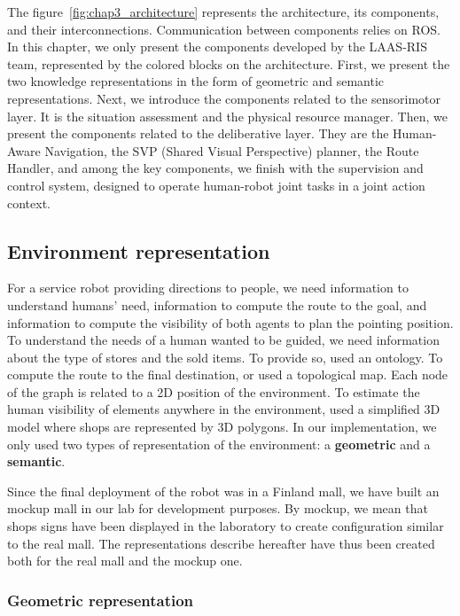 \documentclass[a4paper,11pt,twoside]{StyleThese}
\begin{document}
The figure~\ref{fig:chap3_architecture} represents the architecture, its components, and their interconnections. Communication between components relies on ROS. In this chapter, we only present the components developed by the LAAS-RIS team, represented by the colored blocks on the architecture. First, we present the two knowledge representations in the form of geometric and semantic representations. Next, we introduce the components related to the sensorimotor layer. It is the situation assessment and the physical resource manager. Then, we present the components related to the deliberative layer. They are the Human-Aware Navigation, the SVP (Shared Visual Perspective) planner, the Route Handler, and among the key components, we finish with the supervision and control system, designed to operate human-robot joint tasks in a joint action context. 

\subsection{Environment representation}\label{subsec:models}

For a service robot providing directions to people, we need information to understand humans' need, information to compute the route to the goal, and information to compute the visibility of both agents to plan the pointing position. To understand the needs of a human wanted to be guided, we need information about the type of stores and the sold items. To provide so, \cite{satake_2015_field, satake_2015_should} used an ontology. To compute the route to the final destination, \cite{matsumoto_2012_you} or \cite{okuno_2009_providing} used a topological map. Each node of the graph is related to a 2D position of the environment. To estimate the human visibility of elements anywhere in the environment, \cite{matsumoto_2012_you} used a simplified 3D model where shops are represented by 3D polygons. In our implementation, we only used two types of representation of the environment: a \textbf{geometric} and a \textbf{semantic}.

Since the final deployment of the robot was in a Finland mall, we have built an mockup mall in our lab for development purposes. By mockup, we mean that shops signs have been displayed in the laboratory to create configuration similar to the real mall. The representations describe hereafter have thus been created both for the real mall and the mockup one.

\subsubsection{Geometric representation}
\end{document}
